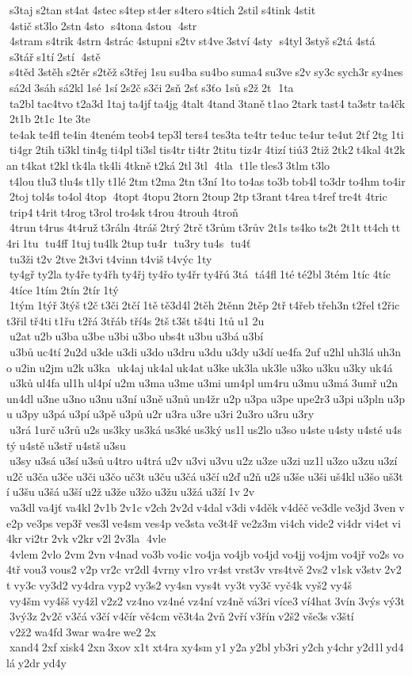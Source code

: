  s3taj s2tan st4at 4stec s4tep st4er s4tero s4tich 2stil s4tink 4stit  4stič st3lo 2stn 4sto  s4tona 4stou  4str  4stram s4trik 4strn 4strác 4stupni s2tv st4ve 3ství 4sty  s4tyl 3styš s2tá 4stá  s3tář s1tí 2stí  4stě  s4těd 3stěh s2těr s2těž s3třej 1su su4ba su4bo suma4 su3ve s2v sy3c sych3r sy4nes sá2d 3sáh sá2kl 1sé 1sí 2s2č s3či 2sň 2sť s3ťo 1sů s2ž 2t  1ta  ta2bl tac4tvo t2a3d 1taj ta4jf ta4jg 4talt 4tand 3taně t1ao 2tark tast4 ta3str ta4čk 2t1b 2t1c 1te 3te  te4ak te4fl te4in 4teném teob4 tep3l ters4 tes3ta te4tr te4uc te4ur te4ut 2tf 2tg 1ti ti4gr 2tih ti3kl tin4g ti4pl ti3sl tis4tr ti4tr 2titu tiz4r 4tizí tiú3 2tiž 2tk2 t4kal 4t2kan t4kat t2kl tk4la tk4li 4tkně t2ká 2tl 3tl  4tla  t1le tles3 3tlm t3lo  t4lou tlu3 tlu4s t1ly t1lé 2tm t2ma 2tn t3ní 1to to4as to3b tob4l to3dr to4hm to4ir 2toj tol4s to4ol 4top  4topt 4topu 2torn 2toup 2tp t3rant t4rea t4ref tre4t 4tric  trip4 t4rit t4rog t3rol tro4sk t4rou 4trouh 4troň  4trun t4rus 4t4ruž t3ráln 4tráš 2trý 2trč t3rům t3rův 2t1s ts4ko ts2t 2t1t tt4ch tt4ri 1tu  tu4ff 1tuj tu4lk 2tup tu4r  tu3ry tu4s  tu4ť  tu3ži t2v 2tve 2t3vi t4vinn t4viš t4výc 1ty  ty4gř ty2la ty4ře ty4řh ty4řj ty4řo ty4řr ty4řú 3tá  tá4fl 1té té2bl 3tém 1tíc 4tíc  4tíce 1tím 2tín 2tír 1tý  1tým 1týř 3týš t2č t3či 2tčí 1tě tě3d4l 2těh 2těnn 2těp 2tř t4řeb třeh3n t2řel t2řic t3řil tř4ti t1řu t2řá 3třáb tří4s 2tš t3št tš4ti 1tů u1 2u  u2at u2b u3ba u3be u3bi u3bo ubs4t u3bu u3bá u3bí  u3bů uc4tí 2u2d u3de u3di u3do u3dru u3du u3dy u3dí ue4fa 2uf u2hl uh3lá uh3no u2in u2jm u2k u3ka  uk4aj uk4al uk4at u3ke uk3la uk3le u3ko u3ku u3ky uk4á  u3ků ul4fa ul1h ul4pí u2m u3ma u3me u3mi um4pl um4ru u3mu u3má 3umř u2n un4dl u3ne u3no u3nu u3ní u3ně u3nů un4žr u2p u3pa u3pe upe2r3 u3pi u3pln u3pu u3py u3pá u3pí u3pě u3pů u2r u3ra u3re u3ri 2u3ro u3ru u3ry  u3rá 1urč u3rů u2s us3ky us3ká us3ké us3ký us1l us2lo u3so u4ste u4sty u4sté u4stý u4stě u3stř u4stš u3su  u3sy u3sá u3sí u3sů u4tro u4trá u2v u3vi u3vu u2z u3ze u3zi uz1l u3zo u3zu u3zí u2č u3ča u3če u3či u3čo uč3t u3ču u3čá u3čí u2ď u2ň u2š u3še u3ši uš4kl u3šo uš3tí u3šu u3šá u3ší u2ž u3že u3žo u3žu u3žá u3ží 1v 2v  va3dl va4jť va4kl 2v1b 2v1c v2ch 2v2d v4dal v3di v4děk v4děč ve3dle ve3jd 3ven ve2p ve3ps vep3ř ves3l ve4sm ves4p ve3sta ve3t4ř ve2z3m vi4ch vide2 vi4dr vi4et vi4kr vi2tr 2vk v2kr v2l 2v3la  4vle  4vlem 2vlo 2vm 2vn v4nad vo3b vo4ic vo4ja vo4jb vo4jd vo4jj vo4jm vo4jř vo2s vo4tř vou3 vous2 v2p vr2c vr2dl 4vrny v1ro vr4st vrst3v vrs4tvě 2vs2 v1sk v3stv 2v2t vy3c vy3d2 vy4dra vyp2 vy3s2 vy4sn vys4t vy3t vy3č vyč4k vyš2 vy4š  vy4šm vy4šš vy4žl v2z2 vz4no vz4né vz4ní vz4ně vá3ri více3 ví4hat 3vín 3výs vý3t 3vý3z 2v2č v3čá v3čí v4čír vě4cm vě3t4a 2vň 2vří v3řín v2š2 vše3s v3ští  v2ž2 wa4fd 3war wa4re we2 2x  xand4 2xf xisk4 2xn 3xov x1t xt4ra xy4sm y1 y2a y2bl yb3ri y2ch y4chr y2d1l yd4lá y2dr yd4y 